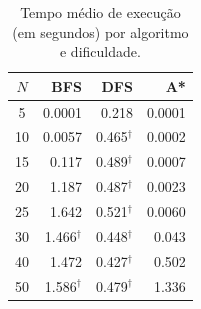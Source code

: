 \begin{table}[htbp]
\centering
\caption{Tempo médio de execução (em segundos) por algoritmo e dificuldade.}
\label{tab:time}
\begin{tabular}{crrr}
\toprule
$N$ & BFS & DFS & A* \\
\midrule
5 & 0.0001 & 0.218 & 0.0001 \\
10 & 0.0057 & 0.465$^\dagger$ & 0.0002 \\
15 & 0.117 & 0.489$^\dagger$ & 0.0007 \\
20 & 1.187 & 0.487$^\dagger$ & 0.0023 \\
25 & 1.642 & 0.521$^\dagger$ & 0.0060 \\
30 & 1.466$^\dagger$ & 0.448$^\dagger$ & 0.043 \\
40 & 1.472 & 0.427$^\dagger$ & 0.502 \\
50 & 1.586$^\dagger$ & 0.479$^\dagger$ & 1.336 \\
\bottomrule
\end{tabular}
\end{table}
